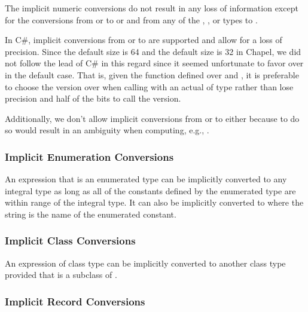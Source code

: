 The implicit numeric conversions do not result in any loss of
information except for the conversions from 
or  to  or  and from
any of the , , or  types
to .

\begin{rationale}
In C\#, implicit conversions from  or 
to  are supported and allow for a loss of precision.
Since the default  size is 64 and the default 
size is 32 in Chapel, we did not follow the lead of C\# in this regard
since it seemed unfortunate to favor  over 
in the default case.  That is, given the  function defined
over  and , it is preferable to choose the
version over  when calling with an actual of
type  rather than lose precision and half of the bits to
call the  version.

Additionally, we don't allow implicit conversions from 
or  to  either because to do so would
result in an ambiguity when computing, e.g., .
\end{rationale}

\subsubsection{Implicit Enumeration Conversions}
\label{Implicit_Enumeration_Conversions}

An expression that is an enumerated type can be implicitly converted
to any integral type as long as all of the constants defined by the
enumerated type are within range of the integral type.  It can also be
implicitly converted to  where the string is the name of
the enumerated constant.

\subsubsection{Implicit Class Conversions}
\label{Implicit_Class_Conversions}

An expression of class type  can be implicitly converted to
another class type  provided that  is a subclass
of .

\subsubsection{Implicit Record Conversions}
\label{Implicit_Record_Conversions}


